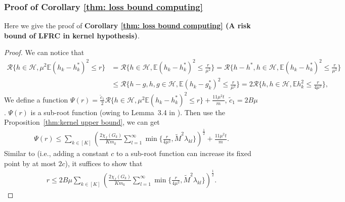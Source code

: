 \documentclass{article}
\def\eE{\mathbb{E}}
\begin{document}
\subsubsection{Proof of Corollary \ref{thm: loss bound computing}}
\label{pro:corollary2.1_proof}
Here we give the proof of \textbf{Corollary \ref{thm: loss bound computing} (A risk bound of LFRC in kernel hypothesis)}.
\begin{proof}  We can notice that 
\begin{align*}
    \mathcal{R}\{ h \in \mathcal{H}, \mu^2 \eE (h_k - h_k^*)^2 \leq r \} & = \mathcal{R}\{ h \in \mathcal{H}, \eE (h_k - h_k^*)^2 \leq \frac{r}{\mu ^2} \} 
     = \mathcal{R}\{ h-h^*, h \in \mathcal{H}, \eE (h_k - h_k^*)^2 \leq \frac{r}{\mu ^2} \} \\
    & \leq \mathcal{R}\{ h - g, h,g \in \mathcal{H}, \eE (h_k - g_k^*)^2 \leq \frac{r}{\mu ^2} \} 
     = 2 \mathcal{R}\{ h, h \in \mathcal{H}, \eE h_k ^2 \leq \frac{r}{4 \mu ^2} \},
\end{align*}
We define a function $\Psi(r) = \frac{\widetilde{c}_1}{2} \mathcal{R}\{ h \in \mathcal{H}, \mu^2\eE (h_k - h_k^*)^2 \leq r \}+\frac{11\mu^2 t}{m}$, $\widetilde{c}_1 = 2B\mu$. $\Psi(r)$ is a sub-root function (owing to Lemma~3.4 in \cite{Bartlett_2005}).
Then use the Proposition~\ref{thm:kernel upper bound}, we can get
\begin{align*}
    \Psi(r) \leq \sum_{k \in [K]} \left( \frac{2 \chi_f(G_k)}{K m_k} \sum_{l=1}^{\infty} \min\{\frac{r}{4 \mu^2},\widetilde{M}^2 \lambda_{kl}\} \right)^{\frac{1}{2}} + \frac{11 \mu^2 t}{m}.
\end{align*}
Similar to \cite{Bartlett_2005} (i.e., adding a constant $c$ to a sub-root function can increase its fixed point by at most $2c$), it suffices to show that 
\begin{align*}
    r \leq 2B\mu \sum_{k \in [K]} \left( \frac{2 \chi_f(G_k)}{K m_k} \sum_{l=1}^{\infty} \min\{\frac{r}{4\mu^2},\widetilde{M}^2 \lambda_{kl}\} \right)^{\frac{1}{2}}.

\end{align*}
\end{proof}
\end{document}
